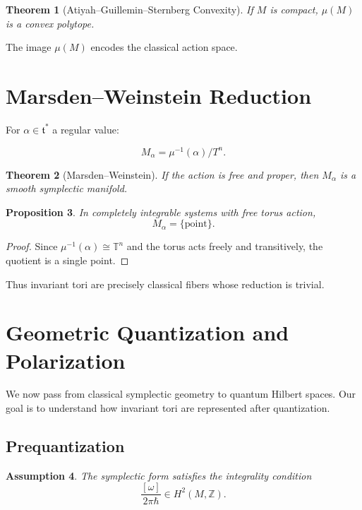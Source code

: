 \documentclass[11pt]{article}
\newtheorem{theorem}{Theorem}[section]
\newtheorem{proposition}[theorem]{Proposition}
\newtheorem{assumption}[theorem]{Assumption}
\begin{document}
\begin{theorem}[Atiyah--Guillemin--Sternberg Convexity]
If $M$ is compact, $\mu(M)$ is a convex polytope.
\end{theorem}

The image $\mu(M)$ encodes the classical action space.

\section{Marsden--Weinstein Reduction}

For $\alpha \in \mathfrak{t}^*$ a regular value:

\[
M_\alpha = \mu^{-1}(\alpha)/T^n.
\]

\begin{theorem}[Marsden--Weinstein]
If the action is free and proper, then $M_\alpha$ is a smooth symplectic manifold.
\end{theorem}

\begin{proposition}
In completely integrable systems with free torus action,
\[
M_\alpha = \{\mathrm{point}\}.
\]
\end{proposition}

\begin{proof}
Since $\mu^{-1}(\alpha) \cong \mathbb{T}^n$ and the torus acts freely and transitively,
the quotient is a single point.
\end{proof}

Thus invariant tori are precisely classical fibers whose reduction is trivial.

\section{Geometric Quantization and Polarization}

We now pass from classical symplectic geometry to quantum Hilbert spaces.
Our goal is to understand how invariant tori are represented after quantization.

\subsection{Prequantization}

\begin{assumption}
The symplectic form satisfies the integrality condition
\[
\frac{[\omega]}{2\pi\hbar} \in H^2(M,\mathbb{Z}).
\]
\end{assumption}
\end{document}
